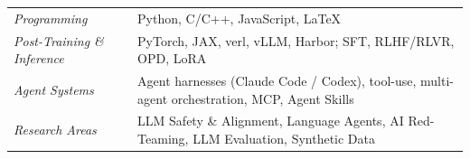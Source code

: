 \begin{longtable}[l]{@{}>{\raggedright\arraybackslash}p{} p{}@{}}
    \textit{Programming}              & Python, C/C++, JavaScript, \LaTeX \\[0.3em]
    \textit{Post-Training \& Inference} & PyTorch, JAX, verl, vLLM, Harbor; SFT, RLHF/RLVR, OPD, LoRA \\[0.3em]
    \textit{Agent Systems}            & Agent harnesses (Claude Code / Codex), tool-use, multi-agent orchestration, MCP, Agent Skills \\[0.3em]
    \textit{Research Areas}           & LLM Safety \& Alignment, Language Agents, AI Red-Teaming, LLM Evaluation, Synthetic Data
\end{longtable}
